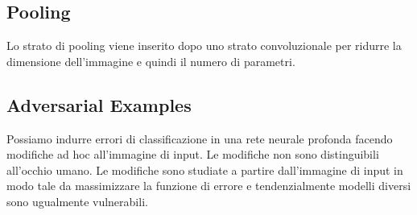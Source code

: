 \subsection{Pooling}

Lo strato di pooling viene inserito dopo uno strato convoluzionale per ridurre
la dimensione dell'immagine e quindi il numero di parametri.\\

\subsection{Adversarial Examples}

Possiamo indurre errori di classificazione in una rete neurale profonda facendo
modifiche ad hoc all'immagine di input. Le modifiche non sono distinguibili
all'occhio umano. Le modifiche sono studiate a partire dall'immagine di input in
modo tale da massimizzare la funzione di errore e tendenzialmente modelli
diversi sono ugualmente vulnerabili.
